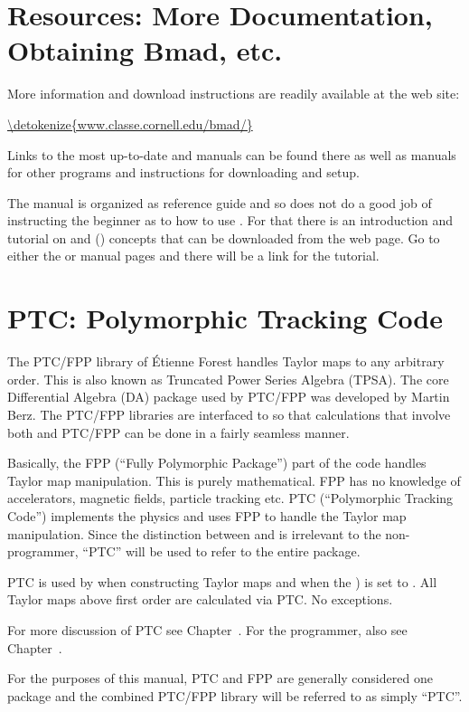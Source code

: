 \section{Resources: More Documentation, Obtaining Bmad, etc.}
\label{s:bmad.web}

More information and download instructions are readily available at the \bmad web site:
\begin{example}
  \url{\detokenize{www.classe.cornell.edu/bmad/}}
\end{example}
Links to the most up-to-date \bmad and \tao manuals can be found there as well as manuals for other
programs and instructions for downloading and setup.

The \bmad manual is organized as reference guide and so does not do a good job of instructing the
beginner as to how to use \bmad. For that there is an introduction and tutorial on \bmad and \tao
() concepts that can be downloaded from the \bmad web page. Go to either the \bmad or
\tao manual pages and there will be a link for the tutorial.

\section{PTC: Polymorphic Tracking Code}
\label{s:ptc.intro}

The PTC/FPP library of \'Etienne Forest handles Taylor maps to any arbitrary order. This is also
known as Truncated Power Series Algebra (TPSA). The core Differential Algebra (DA) package used by
PTC/FPP was developed by Martin Berz\cite{b:berz}. The PTC/FPP libraries are interfaced to \bmad so
that calculations that involve both \bmad and PTC/FPP can be done in a fairly seamless manner.

Basically, the FPP (``Fully Polymorphic Package'') part of the code handles Taylor map
manipulation. This is purely mathematical. FPP has no knowledge of accelerators, magnetic fields,
particle tracking etc. PTC (``Polymorphic Tracking Code'') implements the physics and uses FPP to
handle the Taylor map manipulation. Since the distinction between  and  is
irrelevant to the non-programmer, ``PTC'' will be used to refer to the entire package.

PTC is used by \bmad when constructing Taylor maps and when the 
) is set to . All Taylor maps above first order are calculated
via PTC. No exceptions.

For more discussion of PTC see Chapter~.  For the programmer, also see
Chapter~.

For the purposes of this manual, PTC and FPP are generally considered one package and
the combined PTC/FPP library will be referred to as simply ``PTC''.

